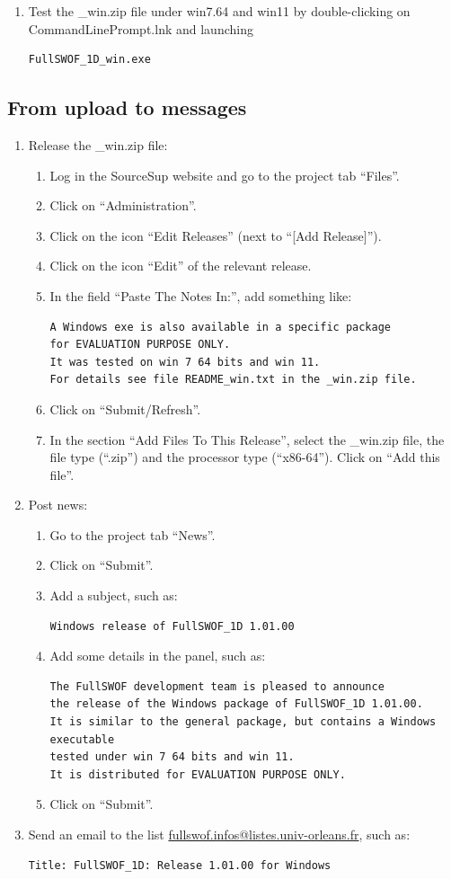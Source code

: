 \documentclass[a4paper, 11pt]{article}
\begin{document}
\begin{enumerate}
\item Test the \_win.zip file under win7.64 and win11 by
double-clicking on CommandLinePrompt.lnk and launching
\begin{verbatim}
FullSWOF_1D_win.exe
\end{verbatim}
\end{enumerate}

\subsection{From upload to messages}
\begin{enumerate}
\item Release the \_win.zip file:
\begin{enumerate}
\item Log in the SourceSup website and go to the project tab ``Files''.
\item Click on ``Administration''.
\item Click on the icon ``Edit Releases'' (next to ``[Add Release]'').
\item Click on the icon ``Edit'' of the relevant release.
\item In the field ``Paste The Notes In:'', add something like:
\begin{verbatim}
A Windows exe is also available in a specific package 
for EVALUATION PURPOSE ONLY.
It was tested on win 7 64 bits and win 11.
For details see file README_win.txt in the _win.zip file.
\end{verbatim}
\item Click on ``Submit/Refresh''.
\item In the section ``Add Files To This Release'', select the \_win.zip file,
the file type (``.zip'') and the processor type  (``x86-64''). Click on ``Add this file''.
\end{enumerate}
\item Post news:
\begin{enumerate}
\item Go to the project tab ``News''.
\item Click on ``Submit''.
\item Add a subject, such as:
\begin{verbatim}
Windows release of FullSWOF_1D 1.01.00
\end{verbatim}
\item Add some details in the panel, such as:
\begin{verbatim}
The FullSWOF development team is pleased to announce
the release of the Windows package of FullSWOF_1D 1.01.00.
It is similar to the general package, but contains a Windows executable 
tested under win 7 64 bits and win 11.
It is distributed for EVALUATION PURPOSE ONLY.
\end{verbatim}
\item Click on ``Submit''.
\end{enumerate}
\item Send an email to the list
\href{mailto:fullswof.infos@listes.univ-orleans.fr}{fullswof.infos@listes.univ-orleans.fr}, such as:
\begin{verbatim}
Title: FullSWOF_1D: Release 1.01.00 for Windows


\end{verbatim}
\end{enumerate}
\end{document}

